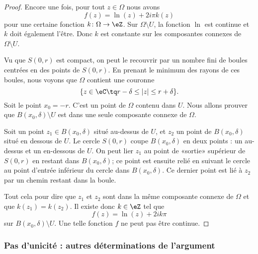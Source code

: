 \begin{proof}
	Encore une fois, pour tout \( z\in \Omega\) nous avons
	\begin{equation}
		f(z)=\ln(z)+2i\pi k(z)
	\end{equation}
	pour une certaine fonction \( k\colon \Omega\to \eZ\). Sur \( \Omega\setminus U\), la fonction \( \ln\) est continue et \( k\) doit également l'être. Donc \( k\) est constante sur les composantes connexes de \( \Omega\setminus U\).

	Vu que \( S(0,r)\) est compact, on peut le recouvrir par un nombre fini de boules centrées en des points de \( S(0,r)\). En prenant le minimum des rayons de ces boules, nous voyons que \( \Omega\) contient une couronne
	\begin{equation}
		\{ z\in \eC\tq r-\delta\leq | z |\leq r+\delta \}.
	\end{equation}
	Soit le point \( x_0=-r\). C'est un point de \( \Omega\) contenu dans \( U\). Nous allons prouver que \( B(x_0,\delta)\setminus U\) est dans une seule composante connexe de \( \Omega\).

	Soit un point \( z_1\in B(x_0,\delta)\) situé au-dessus de \( U\), et \( z_2\) un point de \( B(x_0,\delta)\) situé en dessous de \( U\). Le cercle \( S(0,r)\) coupe \( B(x_0,\delta)\) en deux points : un au-dessus et un en-dessous de \( U\). On peut lier \( z_1\) au point de «sortie» supérieur de \( S(0,r)\) en restant dans \( B(x_0,\delta)\); ce point est ensuite relié en suivant le cercle au point d'entrée inférieur du cercle dans \( B(x_0,\delta)\). Ce dernier point est lié à \( z_2\) par un chemin restant dans la boule.

	Tout cela pour dire que \( z_1\) et \( z_2\) sont dans la même composante connexe de \( \Omega\) et que \( k(z_1)=k(z_2)\). Il existe donc \( k\in \eZ\) tel que
	\begin{equation}
		f(z)=\ln(z)+2ik\pi
	\end{equation}
	sur \( B(x_0,\delta)\setminus U\). Une telle fonction \( f\) ne peut pas être continue.
\end{proof}

\subsubsection{Pas d'unicité : autres déterminations de l'argument}

